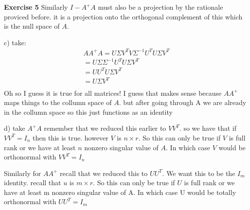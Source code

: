 \documentclass[12pt]{article}
\newenvironment{exercise}[1]{\vspace{.1in}\noindent\textbf{Exercise #1 \hspace{.05em}}}{}
\theoremstyle{definition}
\theoremstyle{remark}
\begin{document}
\begin{exercise}{5}
	Similarly $I-A^+A$ must also be a projection by the rationale proviced before. it is a projection onto the orthogonal complement of this which is the null space of $A$.

	c) take:
	\begin{align}
		AA^+A=U\Sigma V^TV\Sigma^{-1}U^TU\Sigma V^T \\
		=U\Sigma \Sigma^{-1}U^TU\Sigma V^T          \\
		=UU^TU\Sigma V^T                            \\
		=U\Sigma V^T                                \\
	\end{align}
	Oh so I guess it is true for all matrices! I guess that makes sense because $AA^+$ maps things to the collumn space of $A$. but after going through A we are already in the collumn space so this just functions as an identity

	d) take $A^+A$ remember that we reduced this earlier to $VV^T$. so we have that if $VV^T=I_n$ then this is true. however $V$ is $n\times r$. So this can only be true if $V$ is full rank or we have at least $n$ nonzero singular value of $A$. In which case $V$ would be orthonormal with $VV^T=I_n$

	Similarly for $AA^+$ recall that we reduced this to $UU^T$. We want this to be the $I_m$ identity. recall that $u$ is $m\times r$. So this can only be true if $U$ is full rank or we have at least m nonzero singular value of A. In which case U would be totally orthonormal with $UU^T=I_m$


\end{exercise}
\end{document}
